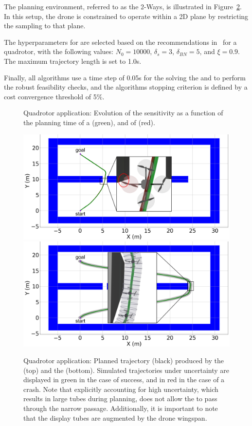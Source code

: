 The planning environment, referred to as the 2-Ways, is illustrated in Figure~\ref{fig:robust_quad}. 
In this setup, the drone is constrained to operate within a 2D plane by restricting the sampling to that plane.

The hyperparameters for  are selected based on the recommendations in~\cite{cSST} for a quadrotor, with the following values: $N_0 = 10000$, $\delta_s = 3$, $\delta_{BN} = 5$, and $\xi = 0.9$.
The maximum trajectory length is set to 1.0s.

Finally, all algorithms use a time step of 0.05s for the solving the  and to perform the robust feasibility checks, and the algorithms stopping criterion is defined by a cost convergence threshold of 5\%.



\begin{figure} [h!]
    \centering
     
    \caption{Quadrotor application: Evolution of the sensitivity as a function of the planning time of a  (green), and of  (red).}%
    \label{fig:samp_quad_time}%
\end{figure}

\begin{figure} [h!]
    \centering
    \includegraphics[width=0.75\linewidth]{figures/samp/non_robust_quad.png}
    \includegraphics[width=0.75\linewidth]{figures/samp/robust_quad.png}
    \caption{Quadrotor application: Planned trajectory (black) produced by the  (top) and the  (bottom). 
    Simulated trajectories under uncertainty are displayed in green in the case of success, and in red in the case of a crash.
    Note that explicitly accounting for high uncertainty, which results in large tubes during planning, does not allow the  to pass through the narrow passage.
    Additionally, it is important to note that the display tubes are augmented by the drone wingspan.}%
    \label{fig:robust_quad}%
\end{figure}

